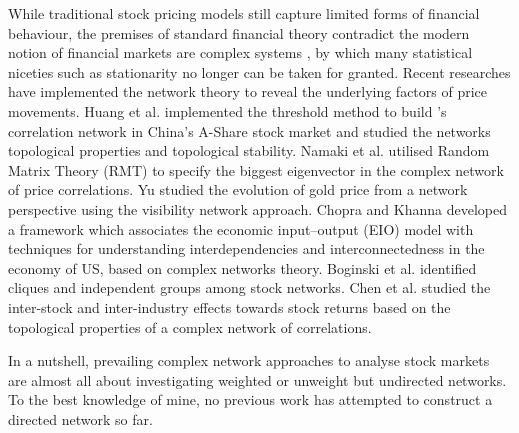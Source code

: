 While traditional stock pricing models still capture limited forms of financial behaviour, the premises of standard financial theory contradict the modern notion of financial markets are complex systems \cite{financialcomplex}, by which many statistical niceties such as stationarity no longer can be taken for granted. Recent researches have implemented the network theory to reveal the underlying factors of price movements. Huang et al. \cite{chinesenetwork} implemented the threshold method to build ’s correlation network in China's A-Share stock market and studied the networks topological properties and topological stability. Namaki et al. \cite{genuine} utilised Random Matrix Theory (RMT) to specify the biggest eigenvector in the complex network of price correlations. Yu \cite{visibility} studied the evolution of gold price from a network perspective using the visibility network approach. Chopra and Khanna \cite{intercd} developed a framework which associates the economic input–output (EIO) model with techniques for understanding interdependencies and interconnectedness in the economy of US, based on complex networks theory. Boginski et al. \cite{statisticalanalysis} identified cliques and independent groups among stock networks. Chen et al. \cite{profitable} studied the inter-stock and inter-industry effects towards stock returns based on the topological properties of a complex network of correlations.

In a nutshell, prevailing complex network approaches to analyse stock markets are almost all about investigating weighted or unweight but undirected networks. To the best knowledge of mine, no previous work has attempted to construct a directed network so far.

